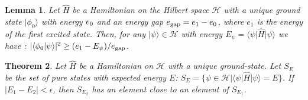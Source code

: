 \documentclass[aps,twocolumn,showpacs,pra,superscriptaddress,floatfix,longbibliography]{revtex4-1}
\newcommand{\7}{\dagger}
\newcommand{\bra}[1]{\mbox{$\langle #1 |$}}
\newcommand{\ket}[1]{\mbox{$| #1 \rangle$}}
\newcommand{\ii}{\bm{i}}
\renewcommand{\H}{\mathcal{H}}
\newtheorem{thm}{Theorem}
\newtheorem{lem}[thm]{Lemma}
\begin{document}
\begin{lem}\label{lem}
Let $\hat{H}$ be a Hamiltonian on the Hilbert space
$\H$ with a unique ground state $\ket{\phi_0}$ with 
energy $e_{\rm 0}$ and an energy gap 
$e_{\rm gap} = e_{\rm 1}-e_{\rm 0}$, where $e_1$ is
the energy of the first excited state. Then, for any 
$\ket{\psi} \in \H$ with energy $E_{\psi} = \bra{\psi}\hat{H}\ket{\psi}$ 
we have \cite{newpaper}:
$|\bra{\phi_{\rm 0}}\psi\rangle|^2 \geq (e_{\rm 1} - E_{\psi})/
e_{\rm gap}$.
\end{lem}

\begin{thm}\label{thm2}
Let $\hat{H}$ be a Hamiltonian on $\H$
with a unique ground-state. 
Let $S_E$ be the set of 
pure states with expected energy $E$:
$S_E = \{\psi \in \H |  \bra{\psi}\hat H\ket{\psi} = E \}$.
If $|E_1 - E_2| < \epsilon$, then $S_{E_2}$ has an element 
close to an element of $S_{E_1}$.
\end{thm}
\end{document}
